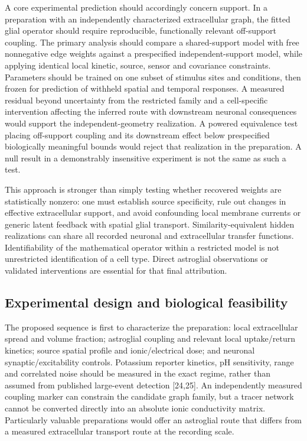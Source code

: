 \documentclass[
  11pt,
]{article}
\begin{document}
A core experimental prediction should accordingly concern support. In a
preparation with an independently characterized extracellular graph, the
fitted glial operator should require reproducible, functionally relevant
off-support coupling. The primary analysis should compare a
shared-support model with free nonnegative edge weights against a
prespecified independent-support model, while applying identical local
kinetic, source, sensor and covariance constraints. Parameters should be
trained on one subset of stimulus sites and conditions, then frozen for
prediction of withheld spatial and temporal responses. A measured
residual beyond uncertainty from the restricted family and a
cell-specific intervention affecting the inferred route with downstream
neuronal consequences would support the independent-geometry
realization. A powered equivalence test placing off-support coupling and
its downstream effect below prespecified biologically meaningful bounds
would reject that realization in the preparation. A null result in a
demonstrably insensitive experiment is not the same as such a test.

This approach is stronger than simply testing whether recovered weights
are statistically nonzero: one must establish source specificity, rule
out changes in effective extracellular support, and avoid confounding
local membrane currents or generic latent feedback with spatial glial
transport. Similarity-equivalent hidden realizations can share all
recorded neuronal and extracellular transfer functions. Identifiability
of the mathematical operator within a restricted model is not
unrestricted identification of a cell type. Direct astroglial
observations or validated interventions are essential for that final
attribution.

\subsection{Experimental design and biological
feasibility}\label{experimental-design-and-biological-feasibility}

The proposed sequence is first to characterize the preparation: local
extracellular spread and volume fraction; astroglial coupling and
relevant local uptake/return kinetics; source spatial profile and
ionic/electrical dose; and neuronal synaptic/excitability controls.
Potassium reporter kinetics, pH sensitivity, range and correlated noise
should be measured in the exact regime, rather than assumed from
published large-event detection {[}24,25{]}. An independently measured
coupling marker can constrain the candidate graph family, but a tracer
network cannot be converted directly into an absolute ionic conductivity
matrix. Particularly valuable preparations would offer an astroglial
route that differs from a measured extracellular transport route at the
recording scale.
\end{document}
